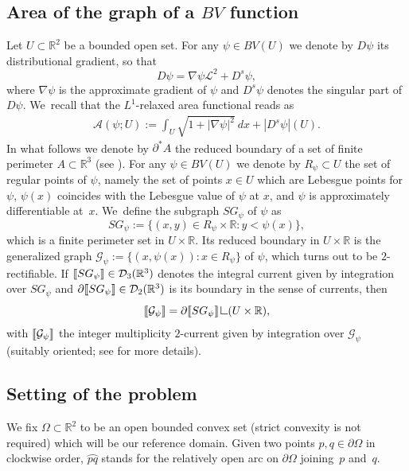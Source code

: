 \documentclass[JEP,XML,SOM,Unicode, NoFloatCountersInSection,published]{cedram}
\newcommand{\R}{\mathbb{R}}
\let\arc\wideparen
\let\Om\Omega
\newcommand{\jump}[1]{\textup{\textlbrackdbl}{#1}\textup{\textrbrackdbl}}
\newcommand{\resa}{\mathop{\hbox{\vrule height 7pt width 0.5pt depth 0pt
\vrule height 0.5pt width 6pt depth 0pt}}\nolimits}
\newcommand{\resb}{\mathop{\hbox{\vrule height 4pt width 0.5pt depth 0pt
\vrule height 0.5pt width 3pt depth 0pt}}\nolimits}
\newcommand{\res}{\mathchoice{\resa}{\resa}{\resb}{\resb}}
\theoremstyle{definition}
\begin{document}
\subsection{Area of the graph of a $BV$ function}
\label{notation}
Let $U\subset \R^2$ be a bounded open set. For any $\psi\in BV(U)$ we
denote by $D\psi$ its distributional gradient, so that
\begin{equation*}
D\psi=\nabla \psi\mathcal{L}^2+D^s\psi,
\end{equation*}
where $\nabla \psi$ is the approximate gradient of $\psi$ and $D^s\psi$ denotes the singular part of $D\psi$. We~recall that the
$L^1$-relaxed area functional reads as \cite{Giusti:84}
\begin{align}\label{def:relaxed_area}
\mathcal A(\psi; U):=\int_U\sqrt{1+|\nabla\psi|^2}~dx+|D^s\psi|(U).
\end{align}
In what follows we denote by $\partial^*A$ the reduced boundary
of a set of finite perimeter $A\subset\R^3$ (see \cite{AFP}).
For any $\psi\in BV(U)$ we denote by $R_\psi\subset U$ the set of regular points of $\psi$, namely the set of points $x\in U$ which are
Lebesgue points for $\psi$, $\psi(x)$
coincides with the
Lebesgue value of $\psi$ at $x$, and $\psi$ is approximately differentiable at~$x$. We~define the subgraph $SG_\psi$ of $\psi$ as
\begin{equation*}
SG_\psi:=\{(x,y)\in R_\psi\times\R\colon y<\psi(x)\},
\end{equation*}
which is a finite perimeter set in $U\times\R$. Its reduced boundary
in $U\times \R$ is the generalized graph $\mathcal G_\psi:=\{(x,\psi(x))\colon x\in R_\psi\}$ of $\psi$,
which turns out to be $2$-rectifiable. If
$\jump{SG_\psi}\in\mathcal D_3(\R^3)$
denotes the integral current given by integration over $SG_\psi$ and
$\partial \jump{SG_\psi}\in\mathcal D_2(\R^3)$ is its boundary in the sense of currents, then
\[
\jump{\mathcal{G}_\psi}=\partial\jump{SG_\psi}\res(U\times\R),
\]
with $\jump{\mathcal{G}_\psi}$ the integer multiplicity $2$-current given by integration over $\mathcal{G}_\psi$ (suitably oriented; see \cite{GiMoSu:98} for more details).

\subsection{Setting of the problem}\label{subsec:setting_of_the_problem}
We fix $\Omega\subset\R^2$ to be an open bounded convex set (strict
convexity is not required) which will be our reference domain. Given two points $p, q \in \partial \Omega$
in clockwise order, $\arc{pq}$ stands for the relatively
open arc on $\partial \Om$ joining~$p$ and~$q$.
\end{document}
